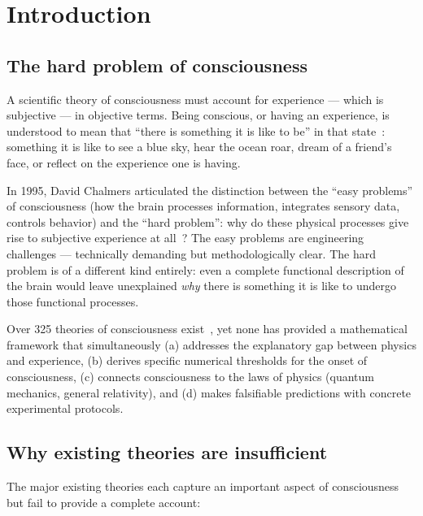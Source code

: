 
\section{Introduction}
\label{sec:introduction}

\subsection{The hard problem of consciousness}

A scientific theory of consciousness must account for experience --- which is subjective ---
in objective terms. Being conscious, or having an experience, is understood to mean that
``there is something it is like to be'' in that state~\cite{nagel1974}: something it is like
to see a blue sky, hear the ocean roar, dream of a friend's face, or reflect on the experience
one is having.

In 1995, David Chalmers articulated the distinction between the ``easy problems'' of
consciousness (how the brain processes information, integrates sensory data, controls behavior)
and the ``hard problem'': why do these physical processes give rise to subjective experience
at all~\cite{chalmers1995}? The easy problems are engineering challenges --- technically
demanding but methodologically clear. The hard problem is of a different kind entirely:
even a complete functional description of the brain would leave unexplained \emph{why} there
is something it is like to undergo those functional processes.

Over 325 theories of consciousness exist~\cite{consciousness-atlas}, yet none has provided a
mathematical framework that simultaneously (a) addresses the explanatory gap between physics
and experience, (b) derives specific numerical thresholds for the onset of consciousness,
(c) connects consciousness to the laws of physics (quantum mechanics, general relativity),
and (d) makes falsifiable predictions with concrete experimental protocols.

\subsection{Why existing theories are insufficient}

The major existing theories each capture an important aspect of consciousness but fail to
provide a complete account:

